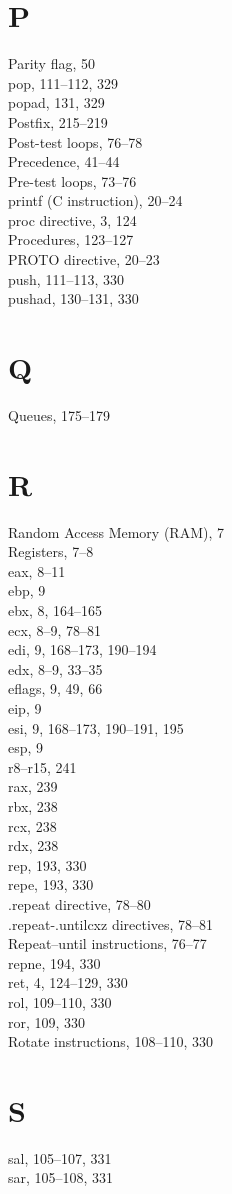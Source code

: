 \documentclass[10pt]{book}
\begin{document}
\section{P}
Parity flag, 50\\
pop, 111--112, 329\\
popad, 131, 329\\
Postfix, 215--219\\
Post-test loops, 76--78\\
Precedence, 41--44\\
Pre-test loops, 73--76\\
printf (C instruction), 20--24\\
proc directive, 3, 124\\
Procedures, 123--127\\
PROTO directive, 20--23\\
push, 111--113, 330\\
pushad, 130--131, 330\\

\section{Q}
Queues, 175--179\\

\section{R}
Random Access Memory (RAM), 7\\
Registers, 7--8\\
eax, 8--11\\
ebp, 9\\
ebx, 8, 164--165\\
ecx, 8--9, 78--81\\
edi, 9, 168--173, 190--194\\
edx, 8--9, 33--35\\
eflags, 9, 49, 66\\
eip, 9\\
esi, 9, 168--173, 190--191, 195\\
esp, 9\\
r8--r15, 241\\
rax, 239\\
rbx, 238\\
rcx, 238\\
rdx, 238\\
rep, 193, 330\\
repe, 193, 330\\
.repeat directive, 78--80\\
.repeat-.untilcxz directives, 78--81\\
Repeat--until instructions, 76--77\\
repne, 194, 330\\
ret, 4, 124--129, 330\\
rol, 109--110, 330\\
ror, 109, 330\\
Rotate instructions, 108--110, 330\\

\section{S}
sal, 105--107, 331\\
sar, 105--108, 331\\

\makeindex
\printindex



\end{document}
